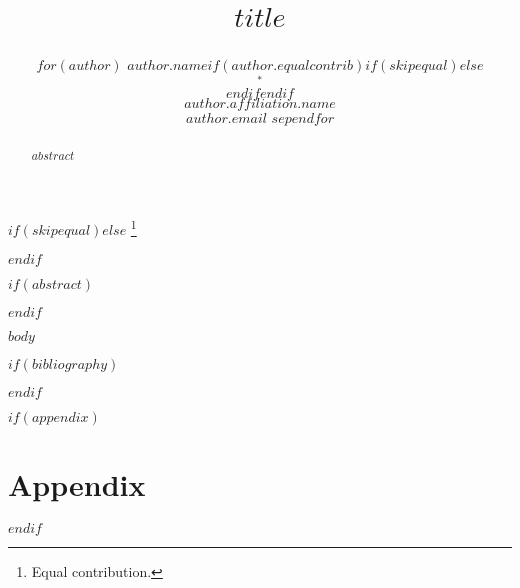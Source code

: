 \documentclass{article}
\title{%
\begin{flushleft}%
$title$%
\end{flushleft}%
}
\author{%
$for(author)$%
$author.name$$if(author.equalcontrib)$$if(skipequal)$$else$$$^\ast$$$endif$$endif$\\
$author.affiliation.name$\\
\texttt{$author.email$}%
$sep$\AND$endfor$%
}
\newcommand\blfootnote[1]{%
  \begingroup
  \renewcommand\thefootnote{}\footnote{\raggedright\hspace{-2em} #1}%
  \addtocounter{footnote}{-1}%
  \endgroup
}
\begin{document}
\maketitle

\setnowidow[2]

$if(skipequal)$$else$\blfootnote{\textsuperscript{\ast}Equal contribution.}$endif$

$if(abstract)$
\begin{abstract}
$abstract$
\end{abstract}
$endif$

$body$

$if(bibliography)$
\small


$endif$

$if(appendix)$
\appendix
\section{Appendix}

$endif$
\end{document}
